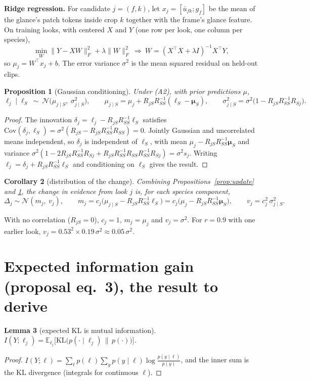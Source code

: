 \documentclass[11pt]{article}
\theoremstyle{plain}
\newtheorem{prop}{Proposition}
\newtheorem{lem}[prop]{Lemma}
\newtheorem{cor}[prop]{Corollary}
\theoremstyle{remark}
\newcommand{\KL}{\mathrm{KL}}
\newcommand{\Cov}{\mathrm{Cov}}
\begin{document}
\textbf{Ridge regression.} For candidate $j=(f,k)$, let $x_j=[\bar u_{fk};g_f]$ be the mean of the glance's patch tokens inside crop $k$ together with the frame's glance feature. On training looks, with centered $X$ and $Y$ (one row per look, one column per species),
\[ \min_W \|Y-XW\|_F^2+\lambda\|W\|_F^2\ \Longrightarrow\ W=(X^\top X+\lambda I)^{-1}X^\top Y, \]
so $\mu_j=W^\top x_j+b$. The error variance $\sigma^2$ is the mean squared residual on held-out clips.

\begin{prop}[Gaussian conditioning]\label{prop:pred}
Under (A2), with prior predictions $\mu$,
\[ \ell_j\mid\bm\ell_S\ \sim\ \mathcal N\big(\mu_{j\mid S},\ \sigma^2_{j\mid S}\big),\qquad
\mu_{j\mid S}=\mu_j+R_{jS}R_{SS}^{-1}(\bm\ell_S-\bm\mu_S),\qquad
\sigma^2_{j\mid S}=\sigma^2\big(1-R_{jS}R_{SS}^{-1}R_{Sj}\big). \]
\end{prop}
\begin{proof}
The innovation $\delta_j=\ell_j-R_{jS}R_{SS}^{-1}\bm\ell_S$ satisfies $\Cov(\delta_j,\bm\ell_S)=\sigma^2(R_{jS}-R_{jS}R_{SS}^{-1}R_{SS})=0$. Jointly Gaussian and uncorrelated means independent, so $\delta_j$ is independent of $\bm\ell_S$, with mean $\mu_j-R_{jS}R_{SS}^{-1}\bm\mu_S$ and variance $\sigma^2(1-2R_{jS}R_{SS}^{-1}R_{Sj}+R_{jS}R_{SS}^{-1}R_{SS}R_{SS}^{-1}R_{Sj})=\sigma^2 s_j$. Writing $\ell_j=\delta_j+R_{jS}R_{SS}^{-1}\bm\ell_S$ and conditioning on $\bm\ell_S$ gives the result.
\end{proof}

\begin{cor}[distribution of the change]\label{cor:delta}
Combining Propositions~\ref{prop:update} and \ref{prop:pred}, the change in evidence from look $j$ is, for each species component,
\[ \Delta_j\sim\mathcal N(m_j,\ v_j),\qquad m_j=c_j\big(\mu_{j\mid S}-R_{jS}R_{SS}^{-1}\bm\ell_S\big)=c_j\big(\mu_j-R_{jS}R_{SS}^{-1}\bm\mu_S\big),\qquad v_j=c_j^2\,\sigma^2_{j\mid S}. \]
\end{cor}
With no correlation ($R_{jS}=0$), $c_j=1$, $m_j=\mu_j$ and $v_j=\sigma^2$. For $r=0.9$ with one earlier look, $v_j=0.53^2\times0.19\,\sigma^2\approx0.05\,\sigma^2$.

\section{Expected information gain (proposal eq.~3), the result to derive}

\begin{lem}[expected KL is mutual information]\label{lem:mi}
$\displaystyle I(Y;\ell_j)=\mathbb E_{\ell_j}\big[\KL\big(p(\cdot\mid\ell_j)\,\|\,p(\cdot)\big)\big]$.
\end{lem}
\begin{proof}
$I(Y;\ell)=\sum_{\ell}p(\ell)\sum_y p(y\mid\ell)\log\frac{p(y\mid\ell)}{p(y)}$, and the inner sum is the KL divergence (integrals for continuous $\ell$).
\end{proof}
\end{document}
